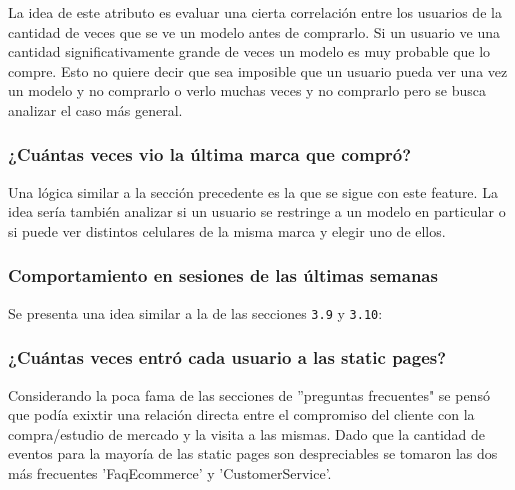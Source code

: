 \documentclass[a4paper]{article}
\begin{document}
La idea de este atributo es evaluar una cierta correlación entre los usuarios de la cantidad de veces que se ve un modelo antes de comprarlo. Si un usuario ve una cantidad significativamente grande de veces un modelo es muy probable que lo compre. Esto no quiere decir que sea imposible que un usuario pueda ver una vez un modelo y no comprarlo o verlo muchas veces y no comprarlo pero se busca analizar el caso más general.

\subsubsection{¿Cuántas veces vio la última marca que compró?}

\begin{sloppypar}
	\texttt{}
\end{sloppypar}

Una lógica similar a la sección precedente es la que se sigue con este feature. La idea sería también analizar si un usuario se restringe a un modelo en particular o si puede ver distintos celulares de la misma marca y elegir uno de ellos.

\subsubsection{Comportamiento en sesiones de las últimas semanas}

\begin{sloppypar}
	\texttt{}
\end{sloppypar}

Se presenta una idea similar a la de las secciones \texttt{3.9} y \texttt{3.10}:

\subsubsection{¿Cuántas veces entró cada usuario a las static pages?}

\begin{sloppypar}
	\texttt{}
\end{sloppypar}

Considerando la poca fama de las secciones de ”preguntas frecuentes" se pensó que podía exixtir una relación directa entre el compromiso del cliente con la compra/estudio de mercado y la visita a las mismas. Dado que la cantidad de eventos para la mayoría de las static pages son despreciables se tomaron las dos más frecuentes ’FaqEcommerce’ y ’CustomerService’.
\end{document}
